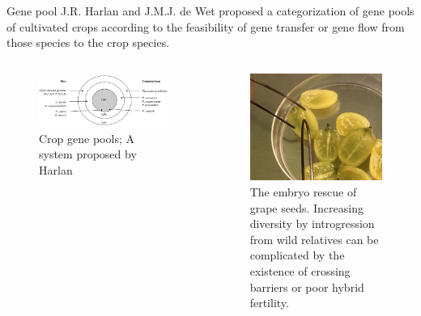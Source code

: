 \documentclass[
  ignorenonframetext,
  aspectratio=169]{beamer}
\newcommand{\bcolumns}{\begin{columns}[T, onlytextwidth]}
\newcommand{\ecolumns}{\end{columns}}
\begin{document}
\begin{frame}{Gene pool}
\protect\hypertarget{gene-pool}{}
J.R. Harlan and J.M.J. de Wet proposed a categorization of gene pools of
cultivated crops according to the feasibility of gene transfer or gene
flow from those species to the crop species.

\bcolumns
{}

\begin{figure}
\includegraphics[width=0.9\linewidth]{../images/crop_gene_pools} \caption{Crop gene pools; A system proposed by Harlan}\label{fig:gene-pools}
\end{figure}


\begin{figure}
\includegraphics[width=0.98\linewidth]{../images/embryo_rescue} \caption{The embryo rescue of grape seeds. Increasing diversity by introgression from wild relatives can be complicated by the existence of crossing barriers or poor hybrid fertility.}\label{fig:embryo-resuce}
\end{figure}

\ecolumns
\end{frame}
\end{document}
